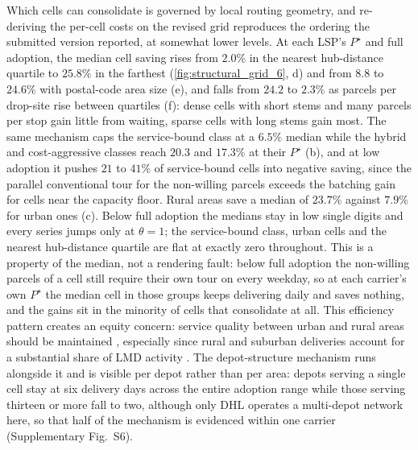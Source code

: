 \documentclass[preprint,12pt,authoryear]{elsarticle}
\begin{document}
Which cells can consolidate is governed by local routing geometry, and re-deriving the per-cell costs on the revised grid reproduces the ordering the submitted version reported, at somewhat lower levels. At each LSP's $P^\star$ and full adoption, the median cell saving rises from $2.0\%$ in the nearest hub-distance quartile to $25.8\%$ in the farthest (\autoref{fig:structural_grid_6}, d) and from $8.8$ to $24.6\%$ with postal-code area size (e), and falls from $24.2$ to $2.3\%$ as parcels per drop-site rise between quartiles (f): dense cells with short stems and many parcels per stop gain little from waiting, sparse cells with long stems gain most. The same mechanism caps the service-bound class at a $6.5\%$ median while the hybrid and cost-aggressive classes reach $20.3$ and $17.3\%$ at their $P^\star$ (b), and at low adoption it pushes $21$ to $41\%$ of service-bound cells into negative saving, since the parallel conventional tour for the non-willing parcels exceeds the batching gain for cells near the capacity floor. Rural areas save a median of $23.7\%$ against $7.9\%$ for urban ones (c). Below full adoption the medians stay in low single digits and every series jumps only at $\theta = 1$; the service-bound class, urban cells and the nearest hub-distance quartile are flat at exactly zero throughout. This is a property of the median, not a rendering fault: below full adoption the non-willing parcels of a cell still require their own tour on every weekday, so at each carrier's own $P^\star$ the median cell in those groups keeps delivering daily and saves nothing, and the gains sit in the minority of cells that consolidate at all.
This efficiency pattern creates an equity concern: service quality between urban and rural areas should be maintained \citep{Pereira04032017}, especially since rural and suburban deliveries account for a substantial share of LMD activity \citep{BIENZEISLER2026104682}. The depot-structure mechanism runs alongside it and is visible per depot rather than per area: depots serving a single cell stay at six delivery days across the entire adoption range while those serving thirteen or more fall to two, although only DHL operates a multi-depot network here, so that half of the mechanism is evidenced within one carrier (Supplementary Fig.~S6).
\end{document}
